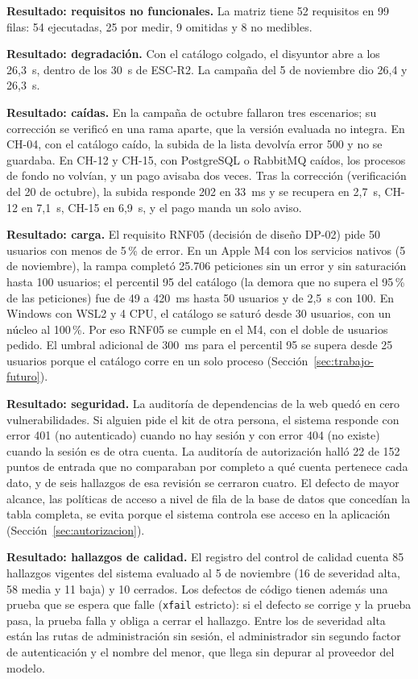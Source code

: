 \textbf{Resultado: requisitos no funcionales.} La matriz tiene 52 requisitos en 99 filas: 54 ejecutadas,
25 por medir, 9 omitidas y 8 no medibles. 

\textbf{Resultado: degradación.} Con el catálogo colgado, el disyuntor abre a los 26,3~s, dentro de los 30~s
de ESC-R2. La campaña del 5 de noviembre dio 26,4 y 26,3~s.

\textbf{Resultado: caídas.} En la campaña de octubre fallaron tres escenarios; su corrección se verificó en una rama aparte, que la versión evaluada no integra. En CH-04, con el catálogo caído,
la subida de la lista devolvía error 500 y no se guardaba. En CH-12 y CH-15, con PostgreSQL o RabbitMQ caídos,
los procesos de fondo no volvían, y un pago avisaba dos veces. Tras la corrección (verificación del 20 de
octubre), la subida responde 202 en 33~ms y se recupera en 2,7~s, CH-12 en 7,1~s, CH-15 en 6,9~s, y el pago manda un solo aviso.

\textbf{Resultado: carga.} El requisito RNF05 (decisión de diseño DP-02) pide 50 usuarios con menos de
5\,\% de error. En un Apple M4 con los servicios nativos (5 de noviembre), la rampa completó 25.706 peticiones
sin un error y sin saturación hasta 100 usuarios; el percentil 95 del catálogo (la demora que no supera el
95\,\% de las peticiones) fue de 49 a 420~ms hasta 50 usuarios y de 2,5~s con 100. En Windows con WSL2 y
4 CPU, el catálogo se saturó desde 30 usuarios, con un núcleo al 100\,\%. Por eso RNF05 se cumple en el M4,
con el doble de usuarios pedido. El umbral adicional de 300~ms para el percentil 95 se supera desde 25 usuarios
porque el catálogo corre en un solo proceso (Sección~\ref{sec:trabajo-futuro}).

\textbf{Resultado: seguridad.} La auditoría de dependencias de la web quedó en cero vulnerabilidades. Si
alguien pide el kit de otra persona, el sistema responde con error 401 (no autenticado) cuando no hay
sesión y con error 404 (no existe) cuando la sesión es de otra cuenta. La auditoría de autorización halló
22 de 152 puntos de entrada que no comparaban por completo a qué cuenta pertenece cada dato, y de seis
hallazgos de esa revisión se cerraron cuatro. El defecto de mayor alcance, las políticas de acceso a nivel
de fila de la base de datos que concedían la tabla completa, se evita porque el sistema controla ese acceso
en la aplicación (Sección~\ref{sec:autorizacion}).

\textbf{Resultado: hallazgos de calidad.} El registro del control de calidad cuenta 85 hallazgos vigentes del sistema evaluado
al 5 de noviembre (16 de severidad alta, 58 media y 11 baja) y 10 cerrados. Los defectos de código tienen además una prueba que se espera
que falle (\texttt{xfail} estricto): si el defecto se corrige y la prueba pasa, la prueba falla y obliga
a cerrar el hallazgo. Entre los de severidad alta están las rutas de administración sin sesión, el
administrador sin segundo factor de autenticación y el nombre del menor, que llega sin depurar al
proveedor del modelo.

